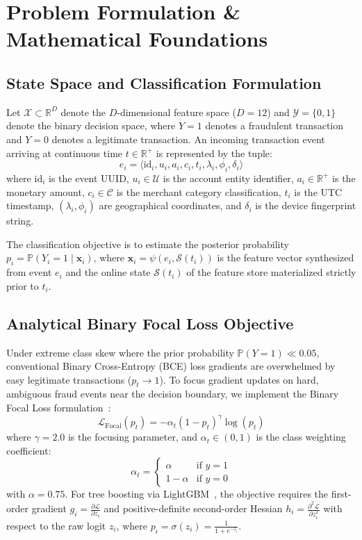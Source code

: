 \section{Problem Formulation \& Mathematical Foundations}
\label{sec:formulation}

\subsection{State Space and Classification Formulation}
Let $\mathcal{X} \subset \mathbb{R}^D$ denote the $D$-dimensional feature space ($D=12$) and $\mathcal{Y} = \{0, 1\}$ denote the binary decision space, where $Y = 1$ denotes a fraudulent transaction and $Y = 0$ denotes a legitimate transaction. An incoming transaction event arriving at continuous time $t \in \mathbb{R}^+$ is represented by the tuple:
\begin{equation}
e_i = \langle \text{id}_i, u_i, a_i, c_i, t_i, \lambda_i, \phi_i, \delta_i \rangle
\end{equation}
where $\text{id}_i$ is the event UUID, $u_i \in \mathcal{U}$ is the account entity identifier, $a_i \in \mathbb{R}^+$ is the monetary amount, $c_i \in \mathcal{C}$ is the merchant category classification, $t_i$ is the UTC timestamp, $(\lambda_i, \phi_i)$ are geographical coordinates, and $\delta_i$ is the device fingerprint string.

The classification objective is to estimate the posterior probability $p_i = \mathbb{P}(Y_i = 1 \mid \mathbf{x}_i)$, where $\mathbf{x}_i = \psi(e_i, \mathcal{S}(t_i))$ is the feature vector synthesized from event $e_i$ and the online state $\mathcal{S}(t_i)$ of the feature store materialized strictly prior to $t_i$.

\subsection{Analytical Binary Focal Loss Objective}
Under extreme class skew where the prior probability $\mathbb{P}(Y = 1) \ll 0.05$, conventional Binary Cross-Entropy (BCE) loss gradients are overwhelmed by easy legitimate transactions ($p_t \to 1$). To focus gradient updates on hard, ambiguous fraud events near the decision boundary, we implement the Binary Focal Loss formulation~\cite{lin2017focal}:
\begin{equation}
\mathcal{L}_{\text{Focal}}(p_t) = -\alpha_t (1 - p_t)^\gamma \log(p_t)
\end{equation}
where $\gamma = 2.0$ is the focusing parameter, and $\alpha_t \in (0, 1)$ is the class weighting coefficient:
\begin{equation}
\alpha_t = \begin{cases} \alpha & \text{if } y = 1 \\ 1 - \alpha & \text{if } y = 0 \end{cases}
\end{equation}
with $\alpha = 0.75$. For tree boosting via LightGBM~\cite{ke2017lightgbm}, the objective requires the first-order gradient $g_i = \frac{\partial \mathcal{L}}{\partial z_i}$ and positive-definite second-order Hessian $h_i = \frac{\partial^2 \mathcal{L}}{\partial z_i^2}$ with respect to the raw logit $z_i$, where $p_i = \sigma(z_i) = \frac{1}{1 + e^{-z_i}}$.

